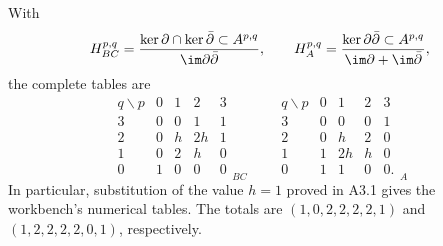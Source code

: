 \begin{proposition}\label{inv:C2.1}
With
\[
H^{p,q}_{BC}=
\frac{\ker\partial\cap\ker\bar\partial\subset A^{p,q}}
{\im\partial\bar\partial},\qquad
H^{p,q}_{A}=
\frac{\ker\partial\bar\partial\subset A^{p,q}}
{\im\partial+\im\bar\partial},
\]
the complete tables are
\begin{equation}\label{inv:eq:C-BC-A}
\begin{array}{c|rrrr}
q\backslash p&0&1&2&3\\\hline
3&0&0&1&1\\
2&0&h&2h&1\\
1&0&2&h&0\\
0&1&0&0&0
\end{array}_{BC}
\qquad
\begin{array}{c|rrrr}
q\backslash p&0&1&2&3\\\hline
3&0&0&0&1\\
2&0&h&2&0\\
1&1&2h&h&0\\
0&1&1&0&0.
\end{array}_{A}
\end{equation}
In particular, substitution of the value $h=1$ proved in A3.1 gives
the workbench's numerical tables.  The totals are
$(1,0,2,2,2,2,1)$ and $(1,2,2,2,2,0,1)$, respectively.
\end{proposition}
